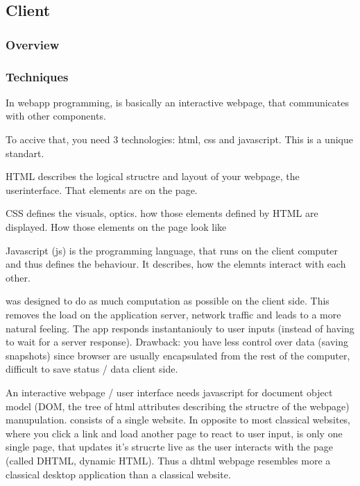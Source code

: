\subsection{Client}
\label{sec:client}

\subsubsection{Overview}
\label{sec:client_overview}


\subsubsection{Techniques}
\label{sec:client_techniques}



In webapp programming, is basically an interactive webpage, that communicates with other components.

To accive that, you need 3 technologies: html, css and javascript. This is a unique standart.

HTML describes the logical structre and layout of your webpage, the userinterface. That elements are on the page.

CSS defines the visuals, optics. how those elements defined by HTML are displayed. How those elements on the page look like

Javascript (js) is the programming language, that runs on the client computer and thus defines the behaviour. It describes, how the elemnts interact with each other.


\spl was designed to do as much computation as possible on the client side.
This removes the load on the application server, network traffic and leads to a more natural feeling.
The app responds instantaniouly to user inputs (instead of having to wait for a server response).
Drawback: you have less control over data (saving snapshots) since browser are usually encapsulated from the rest of the computer, difficult to save status / data client side.


An interactive webpage / user interface needs javascript for document object model (DOM, the tree of html attributes describing the structre of the webpage) manupulation.
\spl consists of a single website.
In opposite to most classical websites, where you click a link and load another page to react to user input, \spl is only one single page, that updates it's strucrte live as the user interacts with the page (called DHTML, dynamic HTML).
Thus a dhtml webpage resembles more a classical desktop application than a classical website.

